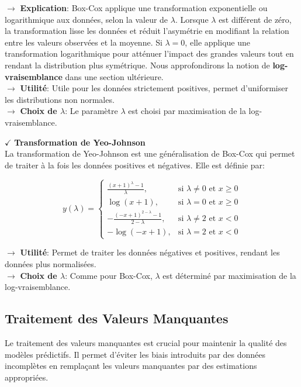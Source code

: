 \noindent \textbf{\(\rightarrow\)} \textbf{Explication}: Box-Cox applique une transformation exponentielle ou logarithmique aux données, selon la valeur de $\lambda$. Lorsque $\lambda$ est différent de zéro, la transformation lisse les données et réduit l'asymétrie en modifiant la relation entre les valeurs observées et la moyenne. Si $\lambda = 0$, elle applique une transformation logarithmique pour atténuer l'impact des grandes valeurs tout en rendant la distribution plus symétrique. Nous approfondirons la notion de \textbf{log-vraisemblance} dans une section ultérieure.\\
\textbf{\(\rightarrow\)} \textbf{Utilité}: Utile pour les données strictement positives, permet d'uniformiser les distributions non normales.\\
\textbf{\(\rightarrow\)} \textbf{Choix de $\lambda$}: Le paramètre $\lambda$ est choisi par maximisation de la log-vraisemblance.

\textbf{\(\checkmark\)} \textbf{Transformation de Yeo-Johnson} \\
La transformation de Yeo-Johnson \cite{haha} est une généralisation de Box-Cox qui permet de traiter à la fois les données positives et négatives. Elle est définie par:

\[
y(\lambda) =
\begin{cases} 
\frac{(x + 1)^\lambda - 1}{\lambda}, & \text{si } \lambda \neq 0 \text{ et } x \geq 0 \\
\log(x + 1), & \text{si } \lambda = 0 \text{ et } x \geq 0 \\
-\frac{(-x + 1)^{2 - \lambda} - 1}{2 - \lambda}, & \text{si } \lambda \neq 2 \text{ et } x < 0 \\
-\log(-x + 1), & \text{si } \lambda = 2 \text{ et } x < 0
\end{cases}
\]

\noindent \textbf{\(\rightarrow\)} \textbf{Utilité}: Permet de traiter les données négatives et positives, rendant les données plus normalisées.\\
\textbf{\(\rightarrow\)} \textbf{Choix de $\lambda$}: Comme pour Box-Cox, $\lambda$ est déterminé par maximisation de la log-vraisemblance.

\subsection{Traitement des Valeurs Manquantes}

Le traitement des valeurs manquantes est crucial pour maintenir la qualité des modèles prédictifs. Il permet d'éviter les biais introduits par des données incomplètes en remplaçant les valeurs manquantes par des estimations appropriées.

